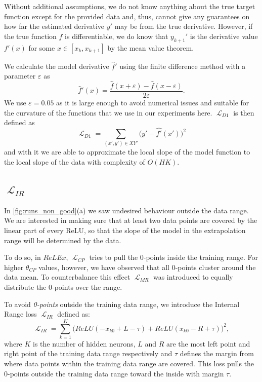 \documentclass[runningheads]{llncs}
\DeclareMathOperator{\Lagr}{\mathcal{L}}
\begin{document}
Without additional assumptions, we do not know anything about the true target function except for the provided data and, thus, cannot give any guarantees on how far the estimated derivative $y'$ may be from the true derivative. 
However, if the true function $f$ is differentiable, we do know that $y_{k+1}'$ is the derivative value $f'(x)$ for some $x \in [x_k, x_{k + 1}]$ by the mean value theorem.

We calculate the model derivative $\hat{f}'$ using the finite difference method with a parameter $\varepsilon$ as 
\begin{equation}
 \hat{f}'(x) = \frac{ \hat{f}(x+\varepsilon)-\hat{f}(x-\varepsilon)}{2\varepsilon}.
\end{equation}
We use $\varepsilon = 0.05$ as it is large enough to avoid numerical issues and suitable for the curvature of the functions that we use in our experiments here. 
$\Lagr_{D1}$ is then defined as 
\begin{equation}
 \Lagr_{D1} = \sum_{(x',y') \in XY'} \big(y' - \hat{f'}(x')\big)^2
\end{equation}
and with it we are able to approximate the local slope of the model function to the local slope of the data with complexity of $O(H K)$.

\subsection{$\Lagr_{IR}$ }

In \autoref{fig:runs_non_good}(a) we saw undesired behaviour outside the data range.
We are interested in making sure that at least two data points are covered by the linear part of every ReLU, so that the slope of the model in the extrapolation range will be determined by the data. 

To do so, in $ReLEx$, $\Lagr_{CP}$ tries to pull the 0-points inside the training range.
For higher $\theta_{CP}$ values, however, we have observed that all 0-points cluster around the data mean. 
To counterbalance this effect $\Lagr_{MR}$ was introduced to equally distribute the 0-points over the range.

To avoid \emph{0-points} outside the training data range, we introduce the Internal Range loss $\Lagr_{IR}$ defined as:
\begin{equation}
 \Lagr_{IR} = \sum_{k=1}^K \big(ReLU(-x_{k0} + L - \tau) + ReLU(x_{k0} - R + \tau)\big)^2, 
\end{equation}
where $K$ is the number of hidden neurons, $L$ and $R$ are the most left point and right point of the training data range respectively and $\tau$ defines the margin from where data points within the training data range are covered.
This loss pulls the 0-points outside the training data range toward the inside with margin $\tau$. 
\end{document}
